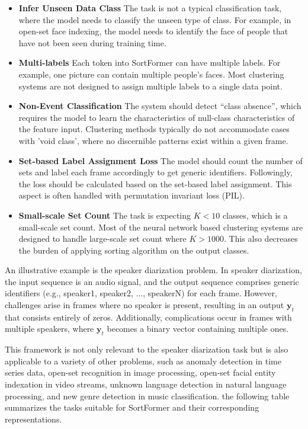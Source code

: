 \documentclass{article}
\begin{document}
\begin{itemize}[leftmargin=*]
  \item \textbf{Infer Unseen Data Class} The task is not a typical classification task, where the model needs to classify the unseen type of class. For example,
        in open-set face indexing, the model needs to identify the face of people that have not been seen during training time.
  \item \textbf{Multi-labels} Each token into SortFormer can have multiple labels. For example, one picture can contain multiple people's faces. Most clustering systems are not designed
        to assign multiple labels to a single data point.
  \item \textbf{Non-Event Classification} The system should detect ``class absence'', which requires the model to learn the characteristics of null-class characteristics of the feature input.
        Clustering methods typically do not accommodate cases with 'void class', where no discernible patterns exist within a given frame.
  \item \textbf{Set-based Label Assignment Loss} The model should count the number of sets and label each frame accordingly to get generic identifiers. Followingly, the loss should be
        calculated based on the set-based label assignment.
        This aspect is often handled with permutation invariant loss (PIL).
  \item \textbf{Small-scale Set Count} The task is expecting $K<10$ classes, which is a small-scale set count. Most of the neural network based clustering systems are designed
        to handle large-scale set count where $K > 1000$. This also
        decreases the burden of applying sorting algorithm on the output classes.
\end{itemize}
An illustrative example is the speaker diarization problem. In speaker diarization, the input sequence is an audio signal, and the output sequence comprises
generic identifiers (e.g., speaker1, speaker2, ..., speakerN) for each frame. However, challenges arise in frames where no speaker is present, resulting in
an output $\mathbf{y}_t$ that consists entirely of zeros. Additionally, complications occur in frames with multiple speakers, where $\mathbf{y}_t$ becomes
a binary vector containing multiple ones.

This framework is not only relevant to the speaker diarization task but is also applicable to a variety of other problems, such as
anomaly detection in time series data,
open-set recognition in image processing,
open-set facial entity indexation in video streams,
unknown language detection in natural language processing,
and new genre detection in music classification.
the following table summarizes the tasks suitable for SortFormer and their corresponding representations.
\end{document}
